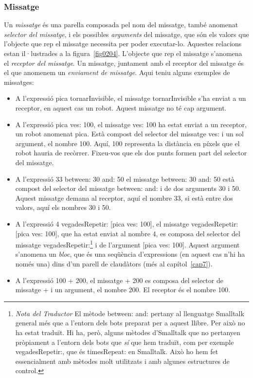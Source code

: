 \subsubsection*{Missatge}
Un \emph{missatge} és una parella composada pel nom del missatge, també anomenat \emph{selector del missatge}, i els possibles \emph{arguments} del missatge, que són els valors que l'objecte que rep el missatge necessita per poder executar-lo. Aquestes relacions estan il·lustrades a la figura~\ref{fig0204}. L'objecte que rep el missatge s'anomena el \emph{receptor del missatge}. Un missatge, juntament amb el receptor del missatge és el que anomenem un \emph{enviament de missatge}. Aqui teniu alguns exemples de missatges:

\begin{itemize}
\item A l'expressió \textsf{pica tornarInvisible}, el missatge \textsf{tornarInvisible} s'ha enviat a un receptor, en aquest cas un robot. Aquest missatge no té cap argument.
\item A l'expressió \textsf{pica ves: 100}, el missatge \textsf{ves: 100} ha estat enviat a un receptor, un robot anomenat \textsf{pica}. Està compost del selector del missatge \textsf{ves:} i un sol argument, el nombre \textsf{100}. Aquí, \textsf{100} representa la distància en píxels que el robot hauria de recòrrer. Fixeu-vos que els dos punts formen part del selector del missatge.
\item A l'expressió \textsf{33 between: 30 and: 50} el missatge  \textsf{between: 30 and: 50} està compost del selector del missatge  \textsf{between: and:} i de dos arguments  \textsf{30} i  \textsf{50}. Aquest missatge demana al receptor, aquí el nombre  \textsf{33}, si està entre dos valors, aquí els nombres \textsf{30} i  \textsf{50}.
\item A l'expressió \textsf{4 vegadesRepetir: [pica ves: 100]}, el missatge \textsf{vegadesRepetir: [pica ves: 100]}, que ha estat enviat al nombre \textsf{4}, es composa del selector del missatge \textsf{vegadesRepetir:}\footnote{\emph{Nota del Traductor} El mètode \textsf{between: and:} pertany al llenguatge Smalltalk general més que a l'entorn dels bots preparat per a aquest llibre. Per això no ha estat traduït. Hi ha, però, alguns mètodes d'Smalltalk que no pertanyen pròpiament a l'entorn dels bots que \emph{sí} que hem traduït, com per exemple \textsf{vegadesRepetir:}, que és \textsf{timesRepeat:} en Smalltalk. Això ho hem fet essencialment amb mètodes molt utilitzats i amb algunes estructures de control.} i de l'argument \textsf{[pica ves: 100]}. Aquest argument s'anomena un \emph{bloc}, que és una seqüència d'expressions (en aquest cas n'hi ha només una) dins d'un parell de claudàtors (més al capítol~\ref{cap7}).
\item A l'expressió \textsf{100 + 200}, el missatge \textsf{+ 200} es composa del selector de missatge \textsf{+} i un argument, el nombre \textsf{200}. El receptor és el nombre \textsf{100}.
\end{itemize}

